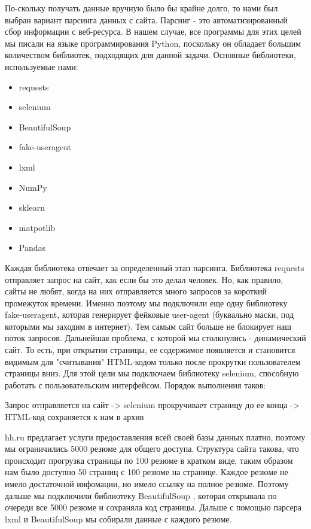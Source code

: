 \documentclass{article}
\begin{document}
По-скольку получать данные вручную было бы крайне долго, то нами был выбран вариант парсинга данных с сайта. 
Парсинг - это автоматизированный сбор информации с веб-ресурса. В нашем случае, все программы для этих целей мы писали на языке программирования Python, поскольку он обладает большим количеством библиотек, подходящих для данной задачи\cite{WEBSITE:2}.
Основные библиотеки, используемые нами:
\begin{itemize}
  \color{red}
  \item \color{black} requests
  \color{red}
  \item \color{black} selenium
  \color{red}
  \item \color{black} BeautifulSoup
  \color{red}
  \item \color{black} fake-useragent
  \color{red}
  \item \color{black} lxml
  \color{red}
  \item \color{black} NumPy
  \color{red}
  \item \color{black} sklearn
   \color{red}
  \item \color{black} matpotlib
   \color{red}
  \item \color{black} Pandas
\end{itemize}

Каждая библиотека отвечает за определенный этап парсинга. Библиотека requests отправляет запрос на сайт, как если бы это делал человек. Но, как правило, сайты не любят, когда на них отправляется много запросов за короткий промежуток времени. Именно поэтому мы подключили еще одну библиотеку fake-useragent, которая генерирует фейковые user-agent (буквально маски, под которыми мы заходим в интернет). Тем самым сайт больше не блокирует наш поток запросов. 
Дальнейшая проблема, с которой мы столкнулись - динамический сайт. То есть, при открытии страницы, ее содержимое появляется и становится видимым для "считывания" HTML-кодом только после прокрутки пользователем страницы вниз. Для этой цели мы подключаем библиотеку selenium, способную работать с пользовательским интерфейсом. Порядок выполнения таков:

Запрос отправляется на сайт -> selenium прокручивает страницу до ее конца -> HTML-код сохраняется к нам в архив\\

\color{black}

hh.ru предлагает услуги предоставления всей своей базы данных платно, поэтому мы ограничились 5000 резюме для общего доступа. 
Структура сайта такова, что происходит прогрузка страницы по 100 резюме в кратком виде, таким образом нам было доступно 50 страниц с 100 резюме на странице. Каждое резюме не имело достаточной инфомации, но имело ссылку на полное резюме. Поэтому дальше мы подключили библиотеку BeautifulSoup , которая открывала по очереди все 5000 резюме и сохраняла код страницы. Дальше с помощью парсера lxml и BeautifulSoup мы собирали данные с каждого резюме. 
\end{document}

